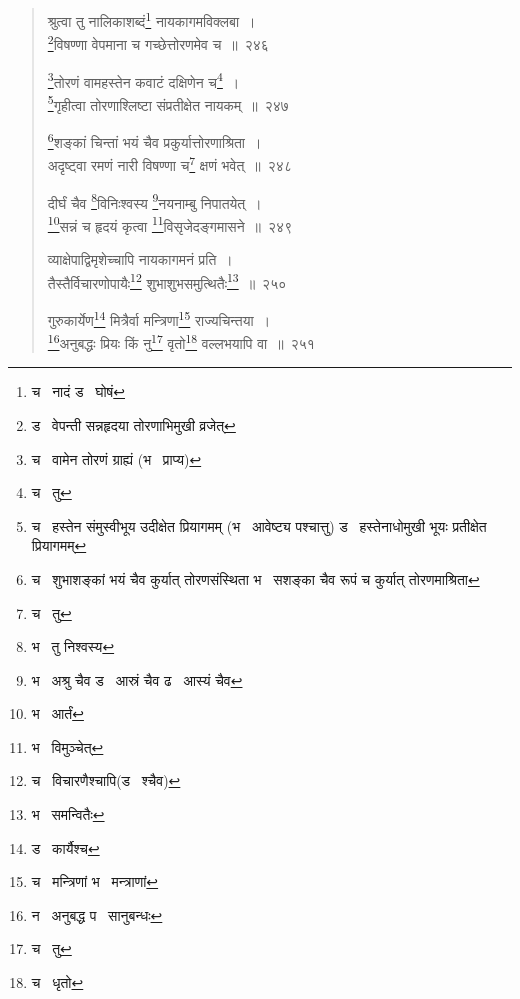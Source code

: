 \documentclass[11pt, openany]{book}
\begin{document}
\begin{quote}
{\na श्रुत्वा तु नालिकाशब्दं\renewcommand{\thefootnote}{1}\footnote{च \textendash\  नादं ड \textendash\  घोषं} नायकागमविक्लबा~।\\
\renewcommand{\thefootnote}{2}\footnote{ड \textendash\  वेपन्ती सन्नहृदया तोरणाभिमुखी व्रजेत्}विषण्णा वेपमाना च गच्छेत्तोरणमेव च~॥~२४६

\renewcommand{\thefootnote}{3}\footnote{च \textendash\  वामेन तोरणं ग्राह्यं (भ \textendash\  प्राप्य)}तोरणं वामहस्तेन कवाटं दक्षिणेन च\renewcommand{\thefootnote}{4}\footnote{च \textendash\  तु}~।\\
\renewcommand{\thefootnote}{5}\footnote{च \textendash\  हस्तेन संमुस्वीभूय उदीक्षेत प्रियागमम् (भ \textendash\  आवेष्ट्य पश्चात्तु) ड \textendash\  हस्तेनाधोमुखी भूयः प्रतीक्षेत प्रियागमम्}गृहीत्वा तोरणाश्लिष्टा संप्रतीक्षेत नायकम्~॥~२४७

\renewcommand{\thefootnote}{6}\footnote{च \textendash\  शुभाशङ्कां भयं चैव कुर्यात् तोरणसंस्थिता भ \textendash\  सशङ्का चैव रूपं च कुर्यात् तोरणमाश्रिता}शङ्कां चिन्तां भयं चैव प्रकुर्यात्तोरणाश्रिता~।\\
अदृष्ट्वा रमणं नारी विषण्णा च\renewcommand{\thefootnote}{7}\footnote{च \textendash\  तु} क्षणं भवेत्~॥~२४८

दीर्घं चैव \renewcommand{\thefootnote}{8}\footnote{भ \textendash\  तु निश्वस्य}विनिःश्वस्य \renewcommand{\thefootnote}{9}\footnote{भ \textendash\  अश्रु चैव ड \textendash\  आस्रं चैव ढ \textendash\  आस्यं चैव}नयनाम्बु निपातयेत्~।\\
\renewcommand{\thefootnote}{10}\footnote{भ \textendash\  आर्तं}सन्नं च हृदयं कृत्वा \renewcommand{\thefootnote}{11}\footnote{भ \textendash\  विमुञ्चेत्}विसृजेदङ्गमासने~॥~२४९

व्याक्षेपाद्विमृशेच्चापि नायकागमनं प्रति~।\\
तैस्तैर्विचारणोपायैः\renewcommand{\thefootnote}{12}\footnote{च \textendash\  विचारणैश्चापि(ड \textendash\  श्चैव)} शुभाशुभसमुत्थितैः\renewcommand{\thefootnote}{13}\footnote{भ \textendash\  समन्वितैः}~॥~२५०

गुरुकार्येण\renewcommand{\thefootnote}{14}\footnote{ड \textendash\  कार्यैश्च} मित्रैर्वा मन्त्रिणा\renewcommand{\thefootnote}{15}\footnote{च \textendash\  मन्त्रिणां भ \textendash\  मन्त्राणां} राज्यचिन्तया~।\\
\renewcommand{\thefootnote}{16}\footnote{न \textendash\  अनुबद्ध प \textendash\  सानुबन्धः}अनुबद्धः प्रियः किं नु\renewcommand{\thefootnote}{17}\footnote{च \textendash\  तु} वृतो\renewcommand{\thefootnote}{18}\footnote{च \textendash\  धृतो} वल्लभयापि वा~॥~२५१}
\end{quote}
\end{document}
